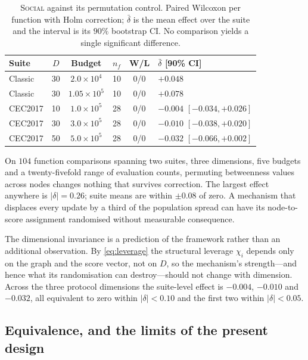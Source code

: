 \begin{table}[t]
\caption{\textsc{Social} against its permutation control. Paired Wilcoxon per
function with Holm correction; $\bar{\delta}$ is the mean effect over the
suite and the interval is its $90\%$ bootstrap CI. No comparison yields a
single significant difference.}
\label{tab:placebo}
\centering
\small
\setlength{\tabcolsep}{4pt}
\begin{tabular}{@{}lccccl@{}}
\toprule
Suite & $D$ & Budget & $n_f$ & W/L & $\bar{\delta}$ [90\% CI] \\
\midrule
Classic & 30 & $2.0\!\times\!10^{4}$  & 10 & 0/0 & $+0.048$ \\
Classic & 30 & $1.05\!\times\!10^{5}$ & 10 & 0/0 & $+0.078$ \\
CEC2017 & 10 & $1.0\!\times\!10^{5}$  & 28 & 0/0 & $-0.004$ $[-0.034,+0.026]$ \\
CEC2017 & 30 & $3.0\!\times\!10^{5}$  & 28 & 0/0 & $-0.010$ $[-0.038,+0.020]$ \\
CEC2017 & 50 & $5.0\!\times\!10^{5}$  & 28 & 0/0 & $-0.032$ $[-0.066,+0.002]$ \\
\bottomrule
\end{tabular}
\end{table}


On $104$ function comparisons spanning two suites, three dimensions, five
budgets and a twenty-fivefold range of evaluation counts, permuting betweenness
values across nodes changes nothing that survives correction. The largest
effect anywhere is $|\delta|=0.26$; suite means are within $\pm0.08$ of zero. A
mechanism that displaces every update by a third of the population spread can
have its node-to-score assignment randomised without measurable consequence.

The dimensional invariance is a prediction of the framework rather than an
additional observation. By \eqref{eq:leverage} the structural leverage
$\chi_i$ depends only on the graph and the score vector, not on $D$, so the
mechanism's strength---and hence what its randomisation can destroy---should
not change with dimension. Across the three protocol dimensions the suite-level
effect is $-0.004$, $-0.010$ and $-0.032$, all equivalent to zero within
$|\delta|<0.10$ and the first two within $|\delta|<0.05$.

\subsection{Equivalence, and the limits of the present design}
\label{sec:res:tost}

